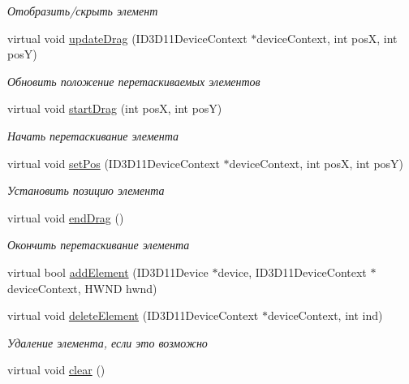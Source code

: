 \begin{DoxyCompactItemize}
\begin{DoxyCompactList}\small\item\em Отобразить/скрыть элемент \end{DoxyCompactList}\item 
virtual void \hyperlink{class_interface_element_class_aabea82698bf88460ebc619195fdd6f83}{update\+Drag} (I\+D3\+D11\+Device\+Context $\ast$device\+Context, int posX, int posY)
\begin{DoxyCompactList}\small\item\em Обновить положение перетаскиваемых элементов \end{DoxyCompactList}\item 
virtual void \hyperlink{class_interface_element_class_a4eabfb2943783e107dfe0aaa6a08da62}{start\+Drag} (int posX, int posY)
\begin{DoxyCompactList}\small\item\em Начать перетаскивание элемента \end{DoxyCompactList}\item 
virtual void \hyperlink{class_interface_element_class_a15833d13e7a9c045032bf8498f25b9e6}{set\+Pos} (I\+D3\+D11\+Device\+Context $\ast$device\+Context, int posX, int posY)
\begin{DoxyCompactList}\small\item\em Установить позицию элемента \end{DoxyCompactList}\item 
virtual void \hyperlink{class_interface_element_class_ac92bb66665d96a17c7ab6204adcf03cd}{end\+Drag} ()
\begin{DoxyCompactList}\small\item\em Окончить перетаскивание элемента \end{DoxyCompactList}\item 
virtual bool \hyperlink{class_interface_element_class_a1d9f9ffdb2f5e00c78d692ccfe50ce2f}{add\+Element} (I\+D3\+D11\+Device $\ast$device, I\+D3\+D11\+Device\+Context $\ast$device\+Context, H\+W\+ND hwnd)
\item 
virtual void \hyperlink{class_interface_element_class_ab8f17e3c917732a8d2ef85cb0cd65eda}{delete\+Element} (I\+D3\+D11\+Device\+Context $\ast$device\+Context, int ind)
\begin{DoxyCompactList}\small\item\em Удаление элемента, если это возможно \end{DoxyCompactList}\item 
virtual void \hyperlink{class_interface_element_class_a0bc6d608e1d1c6bebb6507b7f9a8a220}{clear} ()

\end{DoxyCompactItemize}
